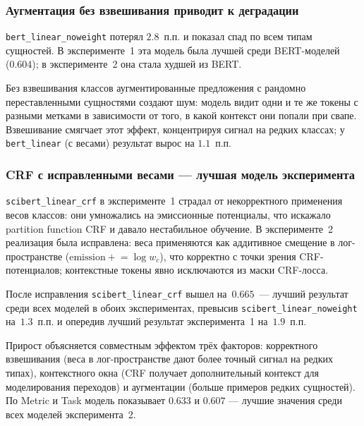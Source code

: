 \subsubsection{Аугментация без взвешивания приводит к деградации}

\texttt{bert\_linear\_noweight} потерял $2.8$~п.п. и показал спад по всем типам сущностей.
В эксперименте~1 эта модель была лучшей среди BERT-моделей (0.604); в эксперименте~2 она стала худшей из BERT.

Без взвешивания классов аугментированные предложения с рандомно переставленными сущностями создают шум: модель видит одни и те же токены с разными метками в зависимости от того, в какой контекст они попали при свапе. Взвешивание смягчает этот эффект, концентрируя сигнал на редких классах; у \texttt{bert\_linear} (с весами) результат вырос на $1.1$~п.п.

\subsubsection{CRF с исправленными весами --- лучшая модель эксперимента}

\texttt{scibert\_linear\_crf} в эксперименте~1 страдал от некорректного применения весов классов: они умножались на эмиссионные потенциалы, что искажало partition function CRF и давало нестабильное обучение. В эксперименте~2 реализация была исправлена: веса применяются как аддитивное смещение в лог-пространстве ($\text{emission} \mathrel{+}= \log w_c$), что корректно с точки зрения CRF-потенциалов; контекстные токены явно исключаются из маски CRF-лосса.

После исправления \texttt{scibert\_linear\_crf} вышел на~$0.665$~--- лучший результат среди всех моделей в обоих экспериментах, превысив \texttt{scibert\_linear\_noweight} на~$1.3$~п.п. и опередив лучший результат эксперимента~1 на~$1.9$~п.п.

Прирост объясняется совместным эффектом трёх факторов: корректного взвешивания (веса в лог-пространстве дают более точный сигнал на редких типах), контекстного окна (CRF получает дополнительный контекст для моделирования переходов) и аугментации (больше примеров редких сущностей). По Metric и Task модель показывает $0.633$ и $0.607$ --- лучшие значения среди всех моделей эксперимента~2.

